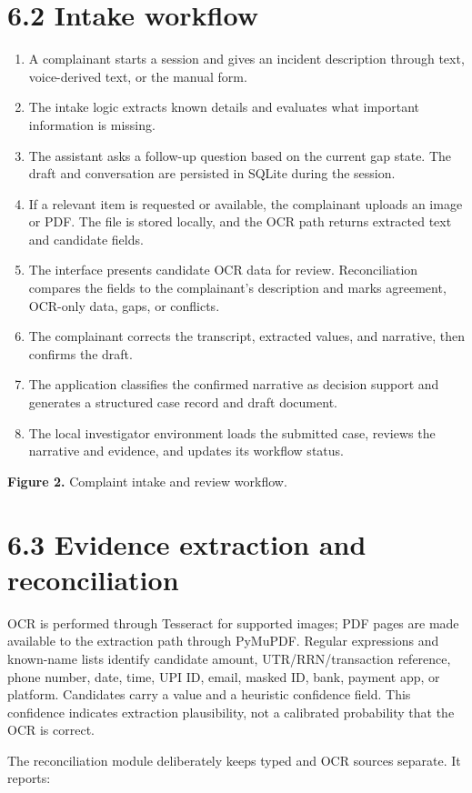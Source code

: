 \documentclass[12pt,a4paper,oneside]{report}
\begin{document}
\section{6.2 Intake workflow}
\begin{enumerate}
\item A complainant starts a session and gives an incident description through text, voice-derived text, or the manual form.
\item The intake logic extracts known details and evaluates what important information is missing.
\item The assistant asks a follow-up question based on the current gap state. The draft and conversation are persisted in SQLite during the session.
\item If a relevant item is requested or available, the complainant uploads an image or PDF. The file is stored locally, and the OCR path returns extracted text and candidate fields.
\item The interface presents candidate OCR data for review. Reconciliation compares the fields to the complainant's description and marks agreement, OCR-only data, gaps, or conflicts.
\item The complainant corrects the transcript, extracted values, and narrative, then confirms the draft.
\item The application classifies the confirmed narrative as decision support and generates a structured case record and draft document.
\item The local investigator environment loads the submitted case, reviews the narrative and evidence, and updates its workflow status.
\end{enumerate}
\textbf{Figure 2.} Complaint intake and review workflow.

\section{6.3 Evidence extraction and reconciliation}
OCR is performed through Tesseract for supported images; PDF pages are made available to the extraction path through PyMuPDF. Regular expressions and known-name lists identify candidate amount, UTR/RRN/transaction reference, phone number, date, time, UPI ID, email, masked ID, bank, payment app, or platform. Candidates carry a value and a heuristic confidence field. This confidence indicates extraction plausibility, not a calibrated probability that the OCR is correct.

The reconciliation module deliberately keeps typed and OCR sources separate. It reports:
\end{document}
